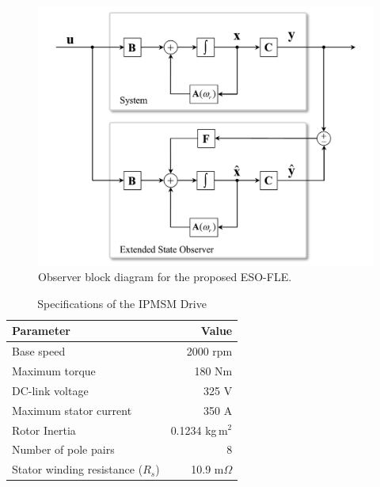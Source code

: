 \documentclass[conference]{IEEEtran}
\begin{document}
\begin{figure}[!t]
    \centering
    \captionsetup{font=footnotesize}
    \includegraphics[width=0.9\columnwidth ]{Fig1_1.pdf}
    \caption{Observer block diagram for the proposed ESO-FLE.}\label{Fig1}
\end{figure}

\begin{table}
\caption{Specifications of the IPMSM Drive}\label{Tab1}
\centering
\begin{tabular}{l r}\hline
\textbf{Parameter} & \textbf{Value}  \\ \hline
Base speed & 2000 rpm \\
Maximum torque & 180 Nm\\
DC-link voltage  & 325 V \\
Maximum stator current  & 350 A \\
Rotor Inertia & 0.1234 kg\,m$^2$ \\
Number of pole pairs & 8\\
Stator winding resistance ($R_s$) & 10.9 m$\Omega$\\\hline
\end{tabular}
\end{table}
\end{document}
